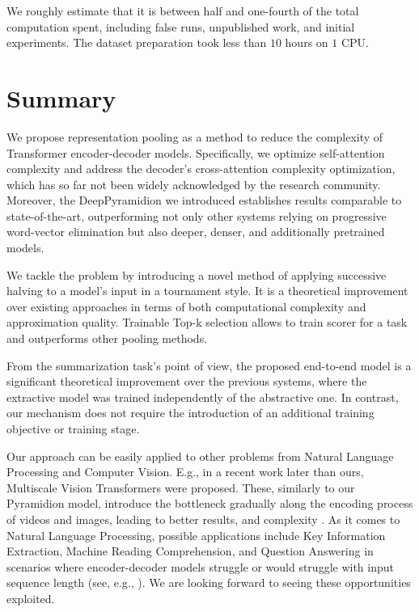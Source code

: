 \documentclass{article}
\begin{document}
We roughly estimate that it is between half and one-fourth of the total computation spent, including false runs, unpublished work, and initial experiments. The dataset preparation took less than $10$ hours on $1$ CPU.


\section{Summary}
We propose representation pooling as a method to reduce the complexity of Transformer encoder-decoder models. 
Specifically, we optimize self-attention complexity and address the decoder's cross-attention complexity optimization, which has so far not been widely acknowledged by the research community.
Moreover, the DeepPyramidion we introduced establishes results comparable to state-of-the-art, outperforming not only other systems relying on progressive word-vector elimination but also deeper, denser, and additionally pretrained models.

We tackle the problem by introducing a novel method of applying successive halving to a model's input in a tournament style. It is a theoretical improvement over existing approaches in terms of both computational complexity and approximation quality. 
Trainable Top-k selection allows to train scorer for a task and outperforms other pooling methods.

From the summarization task's point of view, the proposed end-to-end model is a significant theoretical improvement over the previous systems, where the extractive model was trained independently of the abstractive one. In contrast, our mechanism does not require the introduction of an additional training objective or training stage. 

Our approach can be easily applied to other problems from Natural Language Processing and Computer Vision. E.g., in a recent work later than ours, Multiscale Vision Transformers were proposed. These, similarly to our Pyramidion model, introduce the bottleneck gradually along the encoding process of videos and images, leading to better results, and complexity \cite{DBLP:journals/corr/abs-2104-11227}. As it comes to Natural Language Processing, possible applications include Key Information Extraction, Machine Reading Comprehension, and Question Answering in scenarios where encoder-decoder models struggle or would struggle with input sequence length (see, e.g., \citet{choi-etal-2017-coarse,townsend2021doc2dict,DBLP:journals/corr/abs-1712-07040}). We are looking forward to seeing these opportunities exploited.
\end{document}
